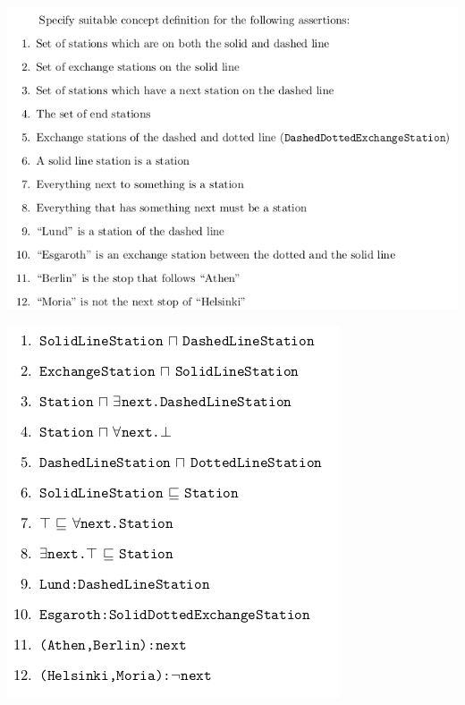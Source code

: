 \documentclass[conference]{styles/acmsiggraph}
\begin{document}
  \begin{minipage}[b]{0.5\linewidth}
  \includegraphics[width=\textwidth]{imgs/assertions.png}
  \end{minipage} 
  \begin{minipage}[b]{0.5\linewidth}
  \includegraphics[width=\textwidth]{imgs/assertions2.png}
  \end{minipage}
  
\end{document}
